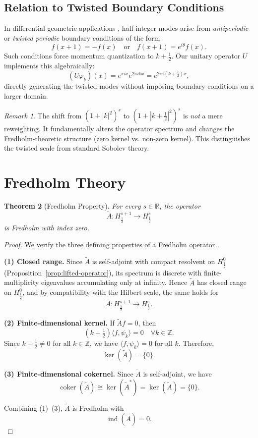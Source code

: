 \documentclass[11pt]{amsart}
\newtheorem{theorem}{Theorem}[section]
\theoremstyle{definition}
\theoremstyle{remark}
\newtheorem{remark}[theorem]{Remark}
\begin{document}
\subsection{Relation to Twisted Boundary Conditions}

In differential-geometric applications \cite{lawson-michelsohn, atiyah-patodi-singer}, half-integer modes arise from \emph{antiperiodic} or \emph{twisted periodic} boundary conditions of the form
\[
f(x+1) = -f(x) \quad \text{or} \quad f(x+1) = e^{i\theta}f(x).
\]
Such conditions force momentum quantization to $k+\tfrac{1}{2}$. Our unitary operator $U$ implements this algebraically:
\[
(U\varphi_k)(x) = e^{\pi ix}e^{2\pi ikx} = e^{2\pi i(k+\tfrac{1}{2})x},
\]
directly generating the twisted modes without imposing boundary conditions on a larger domain.

\begin{remark}
The shift from $(1+|k|^2)^s$ to $(1+|k+\tfrac{1}{2}|^2)^s$ is \emph{not} a mere reweighting. It fundamentally alters the operator spectrum and changes the Fredholm-theoretic structure (zero kernel vs. non-zero kernel). This distinguishes the twisted scale from standard Sobolev theory.
\end{remark}

\section{Fredholm Theory}
\label{sec:fredholm}

\begin{theorem}[Fredholm Property]
\label{thm:fredholm}
For every $s \in \mathbb{R}$, the operator
\[
\widetilde{A} : H^{s+1}_{\frac{1}{2}} \longrightarrow H^s_{\frac{1}{2}}
\]
is Fredholm with index zero.
\end{theorem}

\begin{proof}
We verify the three defining properties of a Fredholm operator \cite{hormander}.

\textbf{(1) Closed range.}
Since $\widetilde{A}$ is self-adjoint with compact resolvent on $H^0_{\frac{1}{2}}$ (Proposition~\ref{prop:lifted-operator}), its spectrum is discrete with finite-multiplicity eigenvalues accumulating only at infinity. Hence $\widetilde{A}$ has closed range on $H^0_{\frac{1}{2}}$, and by compatibility with the Hilbert scale, the same holds for
\[
\widetilde{A} : H^{s+1}_{\frac{1}{2}} \to H^s_{\frac{1}{2}}.
\]

\textbf{(2) Finite-dimensional kernel.}
If $\widetilde{A} f = 0$, then
\[
(k+\tfrac{1}{2}) \langle f, \psi_k \rangle = 0 \quad \forall k \in \mathbb{Z}.
\]
Since $k + \tfrac{1}{2} \neq 0$ for all $k \in \mathbb{Z}$, we have $\langle f, \psi_k \rangle = 0$ for all $k$. Therefore,
\[
\ker(\widetilde{A}) = \{0\}.
\]

\textbf{(3) Finite-dimensional cokernel.}
Since $\widetilde{A}$ is self-adjoint, we have
\[
\operatorname{coker}(\widetilde{A}) \cong \ker(\widetilde{A}^*) = \ker(\widetilde{A}) = \{0\}.
\]

Combining (1)–(3), $\widetilde{A}$ is Fredholm with
\[
\operatorname{ind}(\widetilde{A}) = 0.
\]
\end{proof}
\end{document}
